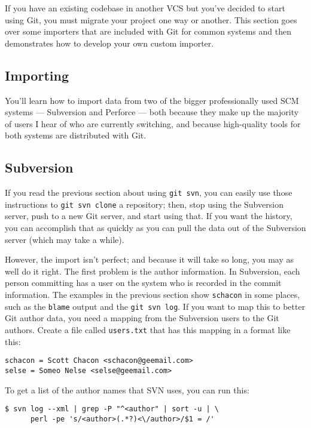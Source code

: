 \documentclass[a4paper]{book}
\begin{document}
If you have an existing codebase in another VCS but you've decided to start using Git, you must migrate your project one way or another. This section goes over some importers that are included with Git for common systems and then demonstrates how to develop your own custom importer.

\subsection{Importing}

You'll learn how to import data from two of the bigger professionally used SCM systems --- Subversion and Perforce --- both because they make up the majority of users I hear of who are currently switching, and because high-quality tools for both systems are distributed with Git.

\subsection{Subversion}

If you read the previous section about using \texttt{git svn}, you can easily use those instructions to \texttt{git svn clone} a repository; then, stop using the Subversion server, push to a new Git server, and start using that. If you want the history, you can accomplish that as quickly as you can pull the data out of the Subversion server (which may take a while).

However, the import isn't perfect; and because it will take so long, you may as well do it right. The first problem is the author information. In Subversion, each person committing has a user on the system who is recorded in the commit information. The examples in the previous section show \texttt{schacon} in some places, such as the \texttt{blame} output and the \texttt{git svn log}. If you want to map this to better Git author data, you need a mapping from the Subversion users to the Git authors. Create a file called \texttt{users.txt} that has this mapping in a format like this:

\begin{shaded}\begin{verbatim}
schacon = Scott Chacon <schacon@geemail.com>
selse = Someo Nelse <selse@geemail.com>
\end{verbatim}\end{shaded}

To get a list of the author names that SVN uses, you can run this:

\begin{shaded}\begin{verbatim}
$ svn log --xml | grep -P "^<author" | sort -u | \
      perl -pe 's/<author>(.*?)<\/author>/$1 = /'
\end{verbatim}\end{shaded}
\end{document}
